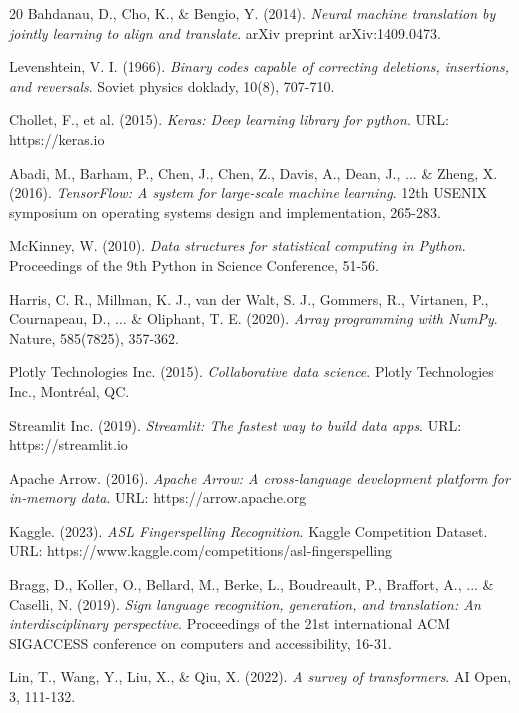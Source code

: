 \documentclass[12pt,a4paper]{article}
\begin{document}
\begin{thebibliography}{20}
Bahdanau, D., Cho, K., \& Bengio, Y. (2014). 
\textit{Neural machine translation by jointly learning to align and translate}. 
arXiv preprint arXiv:1409.0473.

Levenshtein, V. I. (1966). 
\textit{Binary codes capable of correcting deletions, insertions, and reversals}. 
Soviet physics doklady, 10(8), 707-710.

Chollet, F., et al. (2015). 
\textit{Keras: Deep learning library for python}. 
URL: https://keras.io

Abadi, M., Barham, P., Chen, J., Chen, Z., Davis, A., Dean, J., ... \& Zheng, X. (2016). 
\textit{TensorFlow: A system for large-scale machine learning}. 
12th USENIX symposium on operating systems design and implementation, 265-283.

McKinney, W. (2010). 
\textit{Data structures for statistical computing in Python}. 
Proceedings of the 9th Python in Science Conference, 51-56.

Harris, C. R., Millman, K. J., van der Walt, S. J., Gommers, R., Virtanen, P., Cournapeau, D., ... \& Oliphant, T. E. (2020). 
\textit{Array programming with NumPy}. 
Nature, 585(7825), 357-362.

Plotly Technologies Inc. (2015). 
\textit{Collaborative data science}. 
Plotly Technologies Inc., Montréal, QC.

Streamlit Inc. (2019). 
\textit{Streamlit: The fastest way to build data apps}. 
URL: https://streamlit.io

Apache Arrow. (2016). 
\textit{Apache Arrow: A cross-language development platform for in-memory data}. 
URL: https://arrow.apache.org

Kaggle. (2023). 
\textit{ASL Fingerspelling Recognition}. 
Kaggle Competition Dataset. 
URL: https://www.kaggle.com/competitions/asl-fingerspelling

Bragg, D., Koller, O., Bellard, M., Berke, L., Boudreault, P., Braffort, A., ... \& Caselli, N. (2019). 
\textit{Sign language recognition, generation, and translation: An interdisciplinary perspective}. 
Proceedings of the 21st international ACM SIGACCESS conference on computers and accessibility, 16-31.

Lin, T., Wang, Y., Liu, X., \& Qiu, X. (2022). 
\textit{A survey of transformers}. 
AI Open, 3, 111-132.

\end{thebibliography}
\end{document}
